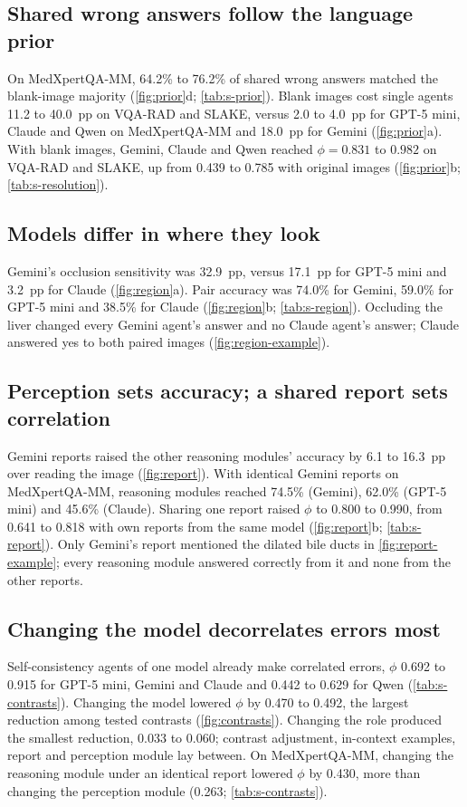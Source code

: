 \subsection{Shared wrong answers follow the language prior}
On MedXpertQA-MM, 64.2\% to 76.2\% of shared wrong answers matched the blank-image majority (\cref{fig:prior}d; \cref{tab:s-prior}).
Blank images cost single agents 11.2 to 40.0~pp on VQA-RAD and SLAKE, versus 2.0 to 4.0~pp for GPT-5 mini, Claude and Qwen on MedXpertQA-MM and 18.0~pp for Gemini (\cref{fig:prior}a).
With blank images, Gemini, Claude and Qwen reached $\phi=0.831$ to $0.982$ on VQA-RAD and SLAKE, up from 0.439 to 0.785 with original images (\cref{fig:prior}b; \cref{tab:s-resolution}).

\subsection{Models differ in where they look}
Gemini's occlusion sensitivity was 32.9~pp, versus 17.1~pp for GPT-5 mini and 3.2~pp for Claude (\cref{fig:region}a).
Pair accuracy was 74.0\% for Gemini, 59.0\% for GPT-5 mini and 38.5\% for Claude (\cref{fig:region}b; \cref{tab:s-region}).
Occluding the liver changed every Gemini agent's answer and no Claude agent's answer; Claude answered yes to both paired images (\cref{fig:region-example}).

\subsection{Perception sets accuracy; a shared report sets correlation}
Gemini reports raised the other reasoning modules' accuracy by 6.1 to 16.3~pp over reading the image (\cref{fig:report}).
With identical Gemini reports on MedXpertQA-MM, reasoning modules reached 74.5\% (Gemini), 62.0\% (GPT-5 mini) and 45.6\% (Claude).
Sharing one report raised $\phi$ to 0.800 to 0.990, from 0.641 to 0.818 with own reports from the same model (\cref{fig:report}b; \cref{tab:s-report}).
Only Gemini's report mentioned the dilated bile ducts in \cref{fig:report-example}; every reasoning module answered correctly from it and none from the other reports.

\subsection{Changing the model decorrelates errors most}
Self-consistency agents of one model already make correlated errors, $\phi$ 0.692 to 0.915 for GPT-5 mini, Gemini and Claude and 0.442 to 0.629 for Qwen (\cref{tab:s-contrasts}).
Changing the model lowered $\phi$ by 0.470 to 0.492, the largest reduction among tested contrasts (\cref{fig:contrasts}).
Changing the role produced the smallest reduction, 0.033 to 0.060; contrast adjustment, in-context examples, report and perception module lay between.
On MedXpertQA-MM, changing the reasoning module under an identical report lowered $\phi$ by 0.430, more than changing the perception module (0.263; \cref{tab:s-contrasts}).

